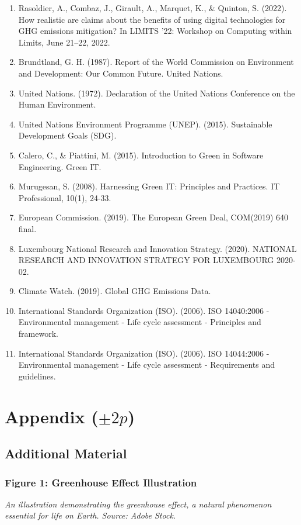 \documentclass[conference,compsoc]{IEEEtran}
\begin{document}
\begin{enumerate}
  \item Rasoldier, A., Combaz, J., Girault, A., Marquet, K., \& Quinton, S. (2022). How realistic are claims about the benefits of using digital technologies for GHG emissions mitigation? In LIMITS '22: Workshop on Computing within Limits, June 21–22, 2022.
  \item Brundtland, G. H. (1987). Report of the World Commission on Environment and Development: Our Common Future. United Nations.
  \item United Nations. (1972). Declaration of the United Nations Conference on the Human Environment.
  \item United Nations Environment Programme (UNEP). (2015). Sustainable Development Goals (SDG).
  \item Calero, C., \& Piattini, M. (2015). Introduction to Green in Software Engineering. Green IT.
  \item Murugesan, S. (2008). Harnessing Green IT: Principles and Practices. IT Professional, 10(1), 24-33.
  \item European Commission. (2019). The European Green Deal, COM(2019) 640 final.
  \item Luxembourg National Research and Innovation Strategy. (2020). NATIONAL RESEARCH AND INNOVATION STRATEGY FOR LUXEMBOURG 2020-02.
  \item Climate Watch. (2019). Global GHG Emissions Data.
  \item International Standards Organization (ISO). (2006). ISO 14040:2006 - Environmental management - Life cycle assessment - Principles and framework.
  \item International Standards Organization (ISO). (2006). ISO 14044:2006 - Environmental management - Life cycle assessment - Requirements and guidelines.
\end{enumerate}

\cleardoublepage
\section*{Appendix ($\pm 2p$)}
\subsection*{Additional Material}

\subsubsection*{Figure 1: Greenhouse Effect Illustration}
\textit{An illustration demonstrating the greenhouse effect, a natural phenomenon essential for life on Earth. Source: Adobe Stock.}
\end{document}
